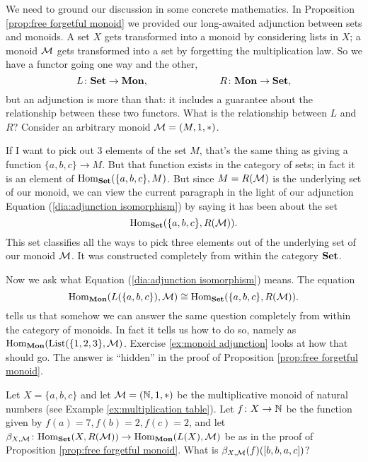 \documentclass[CT4S-EN-RU]{subfiles}
\begin{document}
\begin{exampleENG}
We need to ground our discussion in some concrete mathematics. In Proposition \ref{prop:free forgetful monoid} we provided our long-awaited adjunction between sets and monoids. A set $X$ gets transformed into a monoid by considering lists in $X$; a monoid $\mathcal{M}$ gets transformed into a set by forgetting the multiplication law. So we have a functor going one way and the other, 
$$L\colon{\mathbf{Set}}\rightarrow{\mathbf{Mon}},\hspace{1in}R\colon{\mathbf{Mon}}\rightarrow{\mathbf{Set}},$$
but an adjunction is more than that: it includes a guarantee about the relationship between these two functors. What is the relationship between $L$ and $R$? Consider an arbitrary monoid $\mathcal{M}=(M,1,*)$.

If I want to pick out 3 elements of the set $M$, that's the same thing as giving a function $\{a,b,c\}\to M$. But that function exists in the category of sets; in fact it is an element of $\textnormal{Hom}_{\mathbf{Set}}(\{a,b,c\},M)$. But since $M=R(\mathcal{M})$ is the underlying set of our monoid, we can view the current paragraph in the light of our adjunction Equation (\ref{dia:adjunction isomorphism}) by saying it has been about the set
$$\textnormal{Hom}_{\mathbf{Set}}(\{a,b,c\},R(\mathcal{M})).$$
This set classifies all the ways to pick three elements out of the underlying set of our monoid $\mathcal{M}$. It was constructed completely from within the category ${\mathbf{Set}}$.

Now we ask what Equation (\ref{dia:adjunction isomorphism}) means. The equation
$$\textnormal{Hom}_{\mathbf{Mon}}(L(\{a,b,c\}),\mathcal{M})\cong\textnormal{Hom}_{\mathbf{Set}}(\{a,b,c\},R(\mathcal{M})).$$
tells us that somehow we can answer the same question completely from within the category of monoids. In fact it tells us how to do so, namely as $\textnormal{Hom}_{\mathbf{Mon}}(\textnormal{List}(\{1,2,3\},\mathcal{M})$.  Exercise \ref{ex:monoid adjunction} looks at how that should go. The answer is “hidden” in the proof of Proposition \ref{prop:free forgetful monoid}.
\end{exampleENG}

\begin{exampleRUS}
\end{exampleRUS}

\begin{exerciseENG}\label{ex:monoid adjunction}
Let $X=\{a,b,c\}$ and let $\mathcal{M}=({\mathbb N},1,*)$ be the multiplicative monoid of natural numbers (see Example \ref{ex:multiplication table}). Let $f\colon X\rightarrow{\mathbb N}$ be the function given by $f(a)=7, f(b)=2, f(c)=2$, and let $\beta_{X,\mathcal{M}}\colon\textnormal{Hom}_{\mathbf{Set}}(X,R(\mathcal{M}))\rightarrow\textnormal{Hom}_{\mathbf{Mon}}(L(X),\mathcal{M})$ be as in the proof of Proposition \ref{prop:free forgetful monoid}. What is $\beta_{X,\mathcal{M}}(f)([b,b,a,c])$?
\end{exerciseENG}
\end{document}
